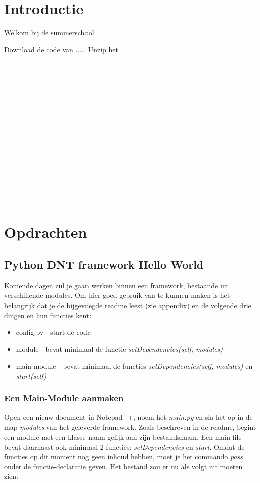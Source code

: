 \documentclass[dutch, a4paper]{article}
\begin{document}
\tableofcontents

\newpage

\section{Introductie}
Welkom bij de summerschool

Download de code van .....
Unzip het 
\\\\\\\\\\\\\\\\\\\\\\\\\\\\\\\\



\section{Opdrachten}

\subsection{Python DNT framework Hello World}
Komende dagen zul je gaan werken binnen een framework, bestaande uit verschillende modules. Om hier goed gebruik van te kunnen maken is het belangrijk dat je de bijgevoegde readme leest (zie appendix) en de volgende drie dingen en hun functies kent:
\begin{itemize}
\item config.py - start de code
\item module - bevat minimaal de functie \textit{setDependencies(self, modules)}
\item main-module - bevat minimaal de functies \textit{setDependencies(self, modules)} en \textit{start(self)}
\end{itemize}

\subsubsection{Een Main-Module aanmaken}
Open een nieuw document in Notepad++, noem het \textit{main.py} en sla het op in de map \textit{modules} van het geleverde framework. 
Zoals beschreven in de readme, begint een module met een klasse-naam gelijk aan zijn bestandsnaam. Een main-file bevat daarnaast ook minimaal 2 functies: \textit{setDependencies} en \textit{start}.
Omdat de functies op dit moment nog geen inhoud hebben, moet je het commando \textit{pass} onder de functie-declaratie geven. Het bestand zou er nu als volgt uit moeten zien:
\end{document}
